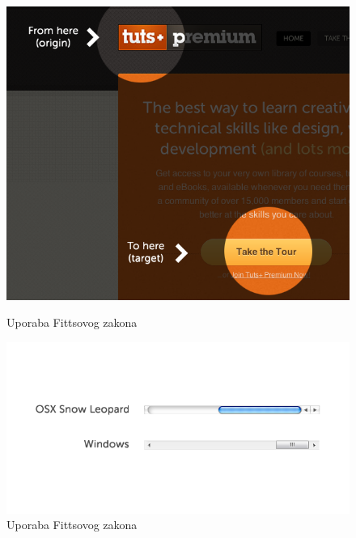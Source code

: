 \documentclass[times, utf8, zavrsni]{fer}
\begin{document}
\begin{figure}[htb]
  \centering
  \begin{minipage}[b]{0.45\textwidth}
    \includegraphics[width=\textwidth]{img/fitts.png}
    \caption{Uporaba Fittsovog zakona}
    \label{fig:fitts}
  \end{minipage}
  \hfill
  \begin{minipage}[b]{0.45\textwidth}
    \includegraphics[width=\textwidth]{img/scroll.png}
    \caption{Uporaba Fittsovog zakona}
    \label{fig:scroll}
  \end{minipage}
\end{figure}
\end{document}
